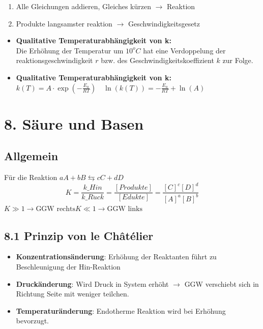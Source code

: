 \begin{multicols*}{4}
{    \begin{enumerate}[noitemsep,leftmargin=*]
        \item Alle Gleichungen addieren, Gleiches kürzen $\rightarrow$ Reaktion
        \item Produkte langsamster reaktion $\rightarrow$ Geschwindigkeitsgesetz
    \end{enumerate}

    \begin{itemize}[noitemsep,leftmargin=*]
        \item \textbf{Qualitative Temperaturabhängigkeit von k:}\\
        Die Erhöhung der Temperatur um $10^oC$ hat eine Verdoppelung der reaktionsgeschwindigkeit $r$
        bzw. des Geschwindigkeitskoeffizient $k$ zur Folge.
        \item \textbf{Qualitative Temperaturabhängigkeit von k:}\\
        \vspace{1mm}
        $k(T)=A\cdot\exp (-\frac{E_a}{RT})\quad\ln (k(T))=-\frac{E_a}{RT}+\ln (A)$
    \end{itemize}
}
\section{8. Säure und Basen}
\subsection{Allgemein}{
    Für die Reaktion $aA+bB\leftrightarrows cC+dD$
    \begin{equation*}
        K=\frac{k\_Hin}{k\_R\ddot{u} ck}=\frac{\left[Produkte\right]}{\left[Edukte\right]}=\frac{{\left[C\right]}^c{\left[D\right]}^d}{{\left[A\right]}^a{\left[B\right]}^b}
    \end{equation*}
    $K\gg 1\rightarrow \text{GGW rechts} $\quad $K\ll 1\rightarrow \text{GGW links}$
    }

    
\subsection{8.1 Prinzip von le Châtélier}{
    \begin{itemize}[noitemsep,leftmargin=*]
        \item \textbf{Konzentrationsänderung}: Erhöhung der Reaktanten führt zu Beschleunigung der Hin-Reaktion
        \item \textbf{Druckänderung}: Wird Druck in System erhöht $\rightarrow$ GGW verschiebt sich in Richtung Seite mit weniger teilchen.
        \item \textbf{Temperaturänderung}: Endotherme Reaktion wird bei Erhöhung bevorzugt.
    \end{itemize}
}



\end{multicols*}

